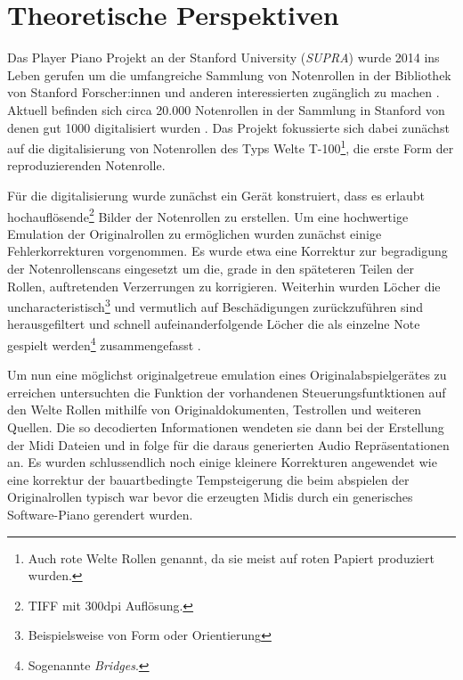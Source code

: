 \section{Theoretische Perspektiven}

Das Player Piano Projekt an der Stanford University (\textit{SUPRA}) wurde 2014 ins Leben gerufen um die umfangreiche Sammlung von Notenrollen in der Bibliothek von Stanford Forscher:innen und anderen interessierten zugänglich zu machen \parencite*[]{shi_2019}.
Aktuell befinden sich circa 20.000 Notenrollen in der Sammlung in Stanford von denen gut 1000 digitalisiert wurden \parencite*[]{broadwell_2022}.
Das Projekt fokussierte sich dabei zunächst auf die digitalisierung von Notenrollen des Typs Welte T-100\footnote{Auch rote Welte Rollen genannt, da sie meist auf roten Papiert produziert wurden.}, die erste Form der reproduzierenden Notenrolle.

Für die digitalisierung wurde zunächst ein Gerät konstruiert, dass es erlaubt hochauflösende\footnote{TIFF mit 300dpi Auflösung.} Bilder der Notenrollen zu erstellen.
Um eine hochwertige Emulation der Originalrollen zu ermöglichen wurden zunächst einige Fehlerkorrekturen vorgenommen.
Es wurde etwa eine Korrektur zur begradigung der Notenrollenscans eingesetzt um die, grade in den späteteren Teilen der Rollen, auftretenden Verzerrungen zu korrigieren.
Weiterhin wurden Löcher die uncharacteristisch\footnote{Beispielsweise von Form oder Orientierung} und vermutlich auf Beschädigungen zurückzuführen sind herausgefiltert und schnell aufeinanderfolgende Löcher die als einzelne Note gespielt werden\footnote{Sogenannte \textit{Bridges}.} zusammengefasst \parencite*[519f]{shi_2019}.

Um nun eine möglichst originalgetreue emulation eines Originalabspielgerätes zu erreichen untersuchten \textcite[521f]{shi_2019} die Funktion der vorhandenen Steuerungsfuntktionen auf den Welte Rollen mithilfe von Originaldokumenten, Testrollen und weiteren Quellen.
Die so decodierten Informationen wendeten sie dann bei der Erstellung der Midi Dateien und in folge für die daraus generierten Audio Repräsentationen an.
Es wurden schlussendlich noch einige kleinere Korrekturen angewendet wie eine korrektur der bauartbedingte Tempsteigerung die beim abspielen der Originalrollen typisch war bevor die erzeugten Midis durch ein generisches Software-Piano gerendert wurden.


